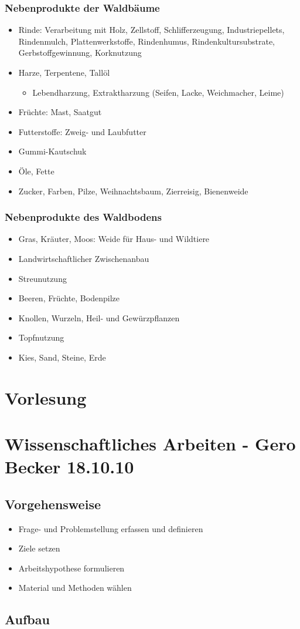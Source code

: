 \documentclass{article}
\begin{document}
\subsubsection{Nebenprodukte der Waldbäume}
\begin{itemize}
  \item Rinde: Verarbeitung mit Holz, Zellstoff, Schlifferzeugung,
  Industriepellets, Rindenmulch, Plattenwerkstoffe, Rindenhumus,
  Rindenkultursubstrate, Gerbstoffgewinnung, Korknutzung
  \item Harze, Terpentene, Tallöl
  \begin{itemize}
    \item Lebendharzung, Extraktharzung (Seifen, Lacke, Weichmacher, Leime)
    \end{itemize}
  \item Früchte: Mast, Saatgut
  \item Futterstoffe: Zweig- und Laubfutter
  \item Gummi-Kautschuk
  \item Öle, Fette
  \item Zucker, Farben, Pilze, Weihnachtsbaum, Zierreisig, Bienenweide
\end{itemize}

\subsubsection{Nebenprodukte des Waldbodens}
\begin{itemize}
  \item Gras, Kräuter, Moos: Weide für Haus- und Wildtiere
  \item Landwirtschaftlicher Zwischenanbau
  \item Streunutzung
  \item Beeren, Früchte, Bodenpilze
  \item Knollen, Wurzeln, Heil- und Gewürzpflanzen
  \item Topfnutzung
  \item Kies, Sand, Steine, Erde
\end{itemize}



\section{Vorlesung}

\section{Wissenschaftliches Arbeiten - Gero Becker 18.10.10}
\subsection*{Vorgehensweise}
\begin{itemize}
  \item Frage- und Problemstellung erfassen und definieren
  \item Ziele setzen
  \item Arbeitshypothese formulieren
  \item Material und Methoden wählen
\end{itemize}
\subsection*{Aufbau}
\end{document}
